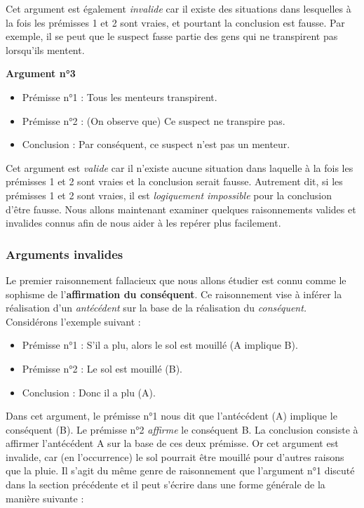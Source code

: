 \documentclass[
  a4paper,11pt,twoside,onecolumn,openright,final,oldfontcommands]{memoir}
\providecommand{\tightlist}{%
  \setlength{\itemsep}{0pt}\setlength{\parskip}{0pt}}
\theoremstyle{definition}
\theoremstyle{definition}
\theoremstyle{definition}
\theoremstyle{definition}
\theoremstyle{remark}
\begin{document}
Cet argument est également \emph{invalide} car il existe des situations dans lesquelles à la fois les prémisses 1 et 2 sont vraies, et pourtant la conclusion est fausse. Par exemple, il se peut que le suspect fasse partie des gens qui ne transpirent pas lorsqu'ils mentent.

\textbf{Argument n°3}

\begin{itemize}
\tightlist
\item
  Prémisse n°1 : Tous les menteurs transpirent.
\item
  Prémisse n°2 : (On observe que) Ce suspect ne transpire pas.
\item
  Conclusion : Par conséquent, ce suspect n'est pas un menteur.
\end{itemize}

Cet argument est \emph{valide} car il n'existe aucune situation dans laquelle à la fois les prémisses 1 et 2 sont vraies et la conclusion serait fausse. Autrement dit, si les prémisses 1 et 2 sont vraies, il est \emph{logiquement impossible} pour la conclusion d'être fausse. Nous allons maintenant examiner quelques raisonnements valides et invalides connus afin de nous aider à les repérer plus facilement.

\hypertarget{arguments-invalides}{%
\subsubsection{Arguments invalides}\label{arguments-invalides}}

Le premier raisonnement fallacieux que nous allons étudier est connu comme le sophisme de l'\textbf{affirmation du conséquent}. Ce raisonnement vise à inférer la réalisation d'un \emph{antécédent} sur la base de la réalisation du \emph{conséquent.} Considérons l'exemple suivant :

\begin{itemize}
\tightlist
\item
  Prémisse n°1 : S'il a plu, alors le sol est mouillé (A implique B).
\item
  Prémisse n°2 : Le sol est mouillé (B).
\item
  Conclusion : Donc il a plu (A).
\end{itemize}

Dans cet argument, le prémisse n°1 nous dit que l'antécédent (A) implique le conséquent (B). Le prémisse n°2 \emph{affirme} le conséquent B. La conclusion consiste à affirmer l'antécédent A sur la base de ces deux prémisse. Or cet argument est invalide, car (en l'occurrence) le sol pourrait être mouillé pour d'autres raisons que la pluie. Il s'agit du même genre de raisonnement que l'argument n°1 discuté dans la section précédente et il peut s'écrire dans une forme générale de la manière suivante :
\end{document}
